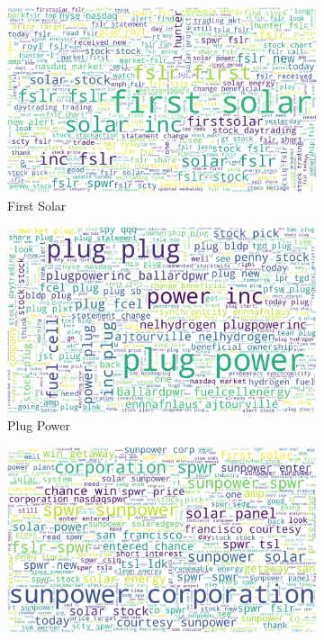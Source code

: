 \documentclass[sigconf, nonacm]{acmart}
\begin{document}
\begin{figure}[H]
\begin{subfigure}{0.25\linewidth}
  \centering
  \includegraphics[width=1\linewidth]{images/first_solar_wordcloud.png}
  \caption{First Solar}
  \label{fig:sfig2}
\end{subfigure}%
\begin{subfigure}{0.25\linewidth}
  \centering
  \includegraphics[width=1\linewidth]{images/plug_power_wordcloud.png}
  \caption{Plug Power}
  \label{fig:sfig3}
\end{subfigure}
\begin{subfigure}{0.25\linewidth}
  \centering
  \includegraphics[width=1\linewidth]{images/sunpower_wordcloud.png}

\end{subfigure}
\end{figure}
\end{document}
